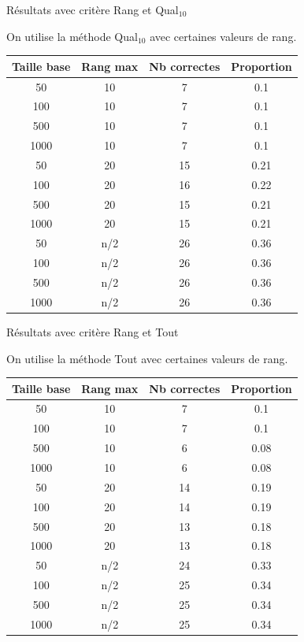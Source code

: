 \documentclass{beamer}
\begin{document}
\begin{frame}{Résultats avec critère Rang et Qual$_{10}$}

On utilise la méthode Qual$_{10}$ avec certaines valeurs de rang.
\begin{tabular}{|c|c|c|c|}
   \hline
   Taille base & Rang max & Nb correctes & Proportion\\
   \hline
   50 & 10  & 7 & 0.1  \\
   \hline
   100 & 10  & 7 & 0.1  \\
   \hline
   500 & 10  & 7 & 0.1  \\
   \hline
   1000 & 10 & 7 & 0.1  \\
   \hline
   \hline
   50 & 20  & 15 & 0.21  \\
   \hline
   100 & 20 & 16 & 0.22  \\
   \hline
   500 & 20 & 15 & 0.21  \\
   \hline
   1000 & 20 & 15 & 0.21  \\
   \hline
   50 & n/2 & 26 & 0.36  \\
   \hline
   100 & n/2 & 26 & 0.36  \\
   \hline
   500 & n/2 & 26 & 0.36  \\
   \hline
   1000 & n/2 & 26 & 0.36  \\
   \hline
\end{tabular}
\end{frame}

\begin{frame}{Résultats avec critère Rang et Tout}

On utilise la méthode Tout avec certaines valeurs de rang.
\begin{tabular}{|c|c|c|c|}
   \hline
   Taille base & Rang max & Nb correctes & Proportion\\
   \hline
   50 & 10  & 7 & 0.1  \\
   \hline
   100 & 10  & 7 & 0.1  \\
   \hline
   500 & 10  & 6 & 0.08  \\
   \hline
   1000 & 10 & 6 & 0.08  \\
   \hline
   \hline
   50 & 20  & 14 & 0.19  \\
   \hline
   100 & 20 & 14 & 0.19  \\
   \hline
   500 & 20 & 13 & 0.18  \\
   \hline
   1000 & 20 & 13 & 0.18  \\
   \hline
   50 & n/2 & 24 & 0.33  \\
   \hline
   100 & n/2 & 25 & 0.34  \\
   \hline
   500 & n/2 & 25 & 0.34  \\
   \hline
   1000 & n/2 & 25 & 0.34  \\
   \hline
\end{tabular}
\end{frame}
\end{document}
